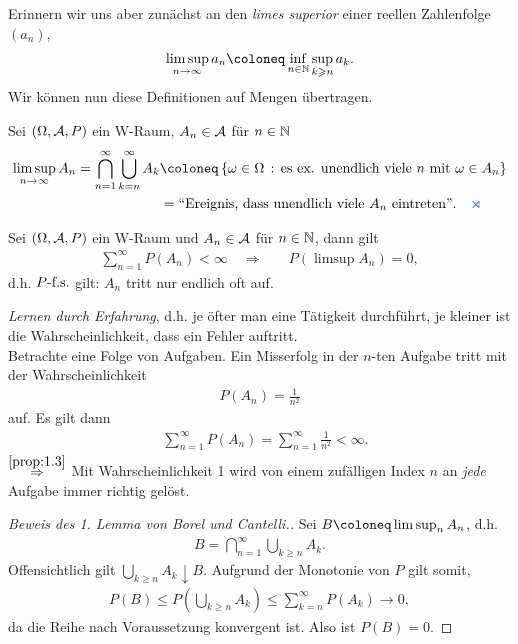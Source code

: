 Erinnern wir uns aber zunächst an den \textit{limes superior} einer reellen
Zahlenfolge $(a_n)$,
\begin{align*}
\limsup\limits_{n\to\infty} a_n \defl
\inf\limits_{n\in\N}\sup\limits_{k\ge n} a_k.
\end{align*}
Wir können nun diese Definitionen auf Mengen übertragen.
\begin{defnn}
Sei $(\Omega,\AA,P)$ ein W-Raum, $A_n\in\AA$ für $n\in\N$
\begin{align*}
\limsup\limits_{n\to\infty} A_n= \bigcap_{n=1}^\infty \bigcup_{k=n}^\infty A_k
&\defl \setdef{\omega\in\Omega}{\text{es ex. unendlich viele $n$ mit
$\omega\in A_n$}}\\
&= \text{``Ereignis, dass unendlich viele $A_n$ eintreten''}.\fishhere
\end{align*}
\end{defnn}

\begin{prop}
\label{prop:1.3}
Sei $(\Omega, \AA, P)$ ein W-Raum und $A_{n}\in\AA$ für $n \in \N$,
dann gilt
\begin{align*}
\sum\limits^{\infty}_{n=1} P(A_{n}) < \infty \quad \Longrightarrow \quad & P
(\limsup A_{n}) = 0,
\end{align*}
d.h.$\Pfs$ gilt: $A_{n} $ tritt nur endlich oft auf.\fishhere
\end{prop}

\begin{bsp}
\textit{Lernen durch Erfahrung}, d.h. je öfter man eine Tätigkeit durchführt, je
kleiner ist die Wahrscheinlichkeit, dass ein Fehler auftritt.\\ Betrachte eine
Folge von Aufgaben. Ein Misserfolg in der $n$-ten Aufgabe tritt mit der
Wahrscheinlichkeit
\begin{align*}
P(A_n) = \frac{1}{n^2}
\end{align*}
auf. Es gilt dann
\begin{align*}
&\sum\limits_{n=1}^\infty P(A_n) = \sum\limits_{n=1}^\infty \frac{1}{n^2} <
\infty.
\end{align*}
$\overset{\ref{prop:1.3}}{\Rightarrow}$ Mit Wahrscheinlichkeit 1 wird von
einem zufälligen Index $n$ an \textit{jede} Aufgabe immer richtig
gelöst.\bsphere
\end{bsp}
\begin{proof}[Beweis des 1. Lemma von Borel und Cantelli.]
Sei $B\defl\limsup_n A_n$, d.h.
\begin{align*}
B = \bigcap_{n=1}^\infty \bigcup_{k\ge n} A_k.
\end{align*}
Offensichtlich gilt $\bigcup_{k\ge n} A_k \downarrow B$. Aufgrund der Monotonie
von $P$ gilt somit,
\begin{align*}
P(B) \le P\left(\bigcup_{k\ge n} A_k \right) \le \sum\limits_{k=n}^\infty
P(A_k) \to 0,
\end{align*}
da die Reihe nach Voraussetzung konvergent ist. Also ist $P(B)=0$.\qedhere
\end{proof}

